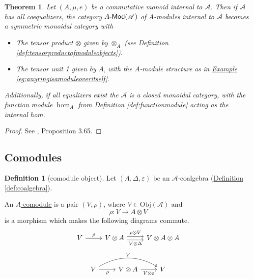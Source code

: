 \documentclass[a4paper,10pt]{scrreprt}
\newcommand{\defn}[1]{\ul{#1}}
\newcommand{\Obj}{\mathrm{Obj}}
\def\mhyp{{\hbox{-}}}
\theoremstyle{definition}
\newtheorem{definition}{Definition}[section]
\theoremstyle{plain}
\newtheorem{theorem}{Theorem}[section]
\theoremstyle{remark}
\begin{document}
\begin{theorem}
  Let $(A, \mu, e)$ be a commutative monoid internal to $\mathscr{A}$. Then if $\mathscr{A}$ has all coequalizers, the category $A\mhyp\mathsf{Mod}(\mathscr{A})$ of $A$-modules internal to $\mathscr{A}$ becomes a symmetric monoidal category with
  \begin{itemize}
    \item The tensor product $\otimes$ given by $\otimes_{A}$ (see \hyperref[def:tensorproductofmoduleobjects]{Definition \ref*{def:tensorproductofmoduleobjects}}).

    \item The tensor unit 1 given by $A$, with the $A$-module structure as in \hyperref[eg:anyringisamoduleoveritself]{Example \ref*{eg:anyringisamoduleoveritself}}.
  \end{itemize}

  Additionally, if all equalizers exist the $\mathscr{A}$ is a closed monoidal category, with the function module $\hom_{A}$ from \hyperref[def:functionmodule]{Definition \ref*{def:functionmodule}} acting as the internal hom.
\end{theorem}
\begin{proof}
  See \cite{nlab-deligne-theorem}, Proposition 3.65.
\end{proof}

\subsection{Comodules}
\begin{definition}[comodule object]
  \label{def:comoduleobject}
  Let $(A, \Delta, \varepsilon)$ be an $\mathscr{A}$-coalgebra (\hyperref[def:coalgebra]{Definition \ref*{def:coalgebra}}).

  An \defn{$A$-comodule} is a pair $(V, \rho)$, where $V \in \Obj(\mathscr{A})$ and
  \begin{equation*}
    \rho\colon V \to A \otimes V
  \end{equation*}
  is a morphism which makes the following diagrams commute.
  \begin{equation*}
    \begin{tikzcd}
      V
      \arrow[r, "\rho"]
      & V \otimes A
      \arrow[r, shift left, "\rho \otimes V"]
      \arrow[r, shift right, swap, "V \otimes \Delta"]
      & V \otimes A \otimes A
    \end{tikzcd}
  \end{equation*}
  \begin{equation*}
    \begin{tikzcd}
      V
      \arrow[rr, bend left, "V"]
      \arrow[r, swap, "\rho"]
      & V \otimes A
      \arrow[r, swap, "V \otimes \varepsilon"]
      & V
    \end{tikzcd}
  \end{equation*}
\end{definition}
\end{document}
